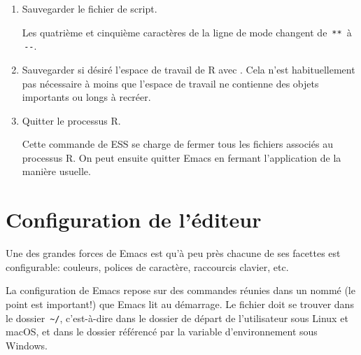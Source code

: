 \begin{enumerate}
\begin{trivlist}
    \hfill
  \end{trivlist}
\item Sauvegarder le fichier de script.
  Les quatrième et cinquième caractères de la ligne de mode changent
  de \,\verb|**|\, à \,\verb|--|.
\item Sauvegarder si désiré l'espace de travail de R avec
  . Cela n'est
  habituellement pas nécessaire à moins que l'espace de travail ne
  contienne des objets importants ou longs à recréer.
\item Quitter le processus R.
  Cette commande de ESS se charge de fermer tous les fichiers associés
  au processus R. On peut ensuite quitter Emacs en fermant
  l'application de la manière usuelle.
\end{enumerate}



\section{Configuration de l'éditeur}
\label{sec:emacs+ess:configuration}

Une des grandes forces de Emacs est qu'à peu près chacune de ses
facettes est configurable: couleurs, polices de caractère, raccourcis
clavier, etc.

La configuration de Emacs repose sur des commandes réunies dans un
nommé  (le point est important!) que Emacs lit au
démarrage. Le fichier  doit se trouver dans le dossier
\,\verb=~/=, c'est-à-dire dans le dossier de départ de l'utilisateur
sous Linux et macOS, et dans le dossier référencé par la variable
d'environnement  sous Windows.

